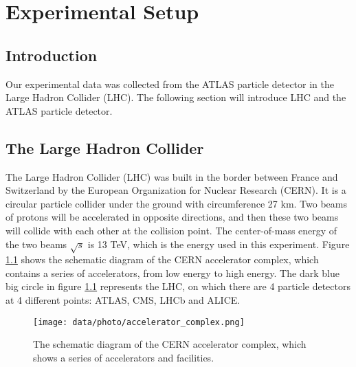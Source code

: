 \chapter{Experimental Setup}
\label{ch:detector}

\section{Introduction}
\label{sec:detector_introduction}

Our experimental data was collected from the ATLAS particle detector in the Large Hadron Collider (LHC).
The following section will introduce LHC and the ATLAS particle detector.

\section{The Large Hadron Collider}
\label{sec:detector_LHC}

The Large Hadron Collider (LHC) was built in the border between France and Switzerland by the European Organization for Nuclear Research (CERN).
It is a circular particle collider under the ground with circumference 27 km.
Two beams of protons will be accelerated in opposite directions, and then these two beams will collide with each other at the collision point. The center-of-mass energy of the two beams $\sqrt{s}$ is 13 TeV, which is the energy used in this experiment. Figure \ref{fig:detector_LHC_accelerator_complex} shows the schematic diagram of the CERN accelerator complex, which contains a series of accelerators, from low energy to high energy. The dark blue big circle in figure \ref{fig:detector_LHC_accelerator_complex} represents the LHC, on which there are 4 particle detectors at 4 different points: ATLAS, CMS, LHCb and ALICE.

\begin{figure}
\centering
\texttt{[image: data/photo/accelerator\_complex.png]}
\caption{The schematic diagram of the CERN accelerator complex, which shows a series of accelerators and facilities. \cite{complex}}
\label{fig:detector_LHC_accelerator_complex}
\end{figure}
